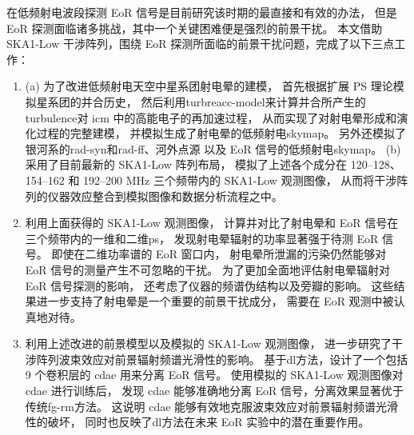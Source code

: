 
\begin{summary}

在低频射电波段探测 EoR 信号是目前研究该时期的最直接和有效的办法，
但是 EoR 探测面临诸多挑战，其中一个关键困难便是强烈的前景干扰。
本文借助 SKA1-Low 干涉阵列，围绕 EoR 探测所面临的前景干扰问题，完成了以下三点工作：
\begin{enumerate}
\item
(a) 为了改进低频射电天空中星系团射电晕的建模，
首先根据扩展 \ac{PS} 理论模拟星系团的并合历史，
然后利用\ac{turbreacc-model}来计算并合所产生的\ac{turbulence}对 \ac{icm}
中的高能电子的再加速过程，
从而实现了对射电晕形成和演化过程的完整建模，
并模拟生成了射电晕的低频射电\ac{skymap}。
另外还模拟了银河系的\ac{rad-syn}和\ac{rad-ff}、河外点源
以及 EoR 信号的低频射电\ac{skymap}。
(b) 采用了目前最新的 SKA1-Low 阵列布局，
模拟了上述各个成分在 \numrange{120}{128}、\numrange{154}{162}
和 \numrange{192}{200} \si{\MHz} 三个频带内的 SKA1-Low 观测图像，
从而将干涉阵列的仪器效应整合到模拟图像和数据分析流程之中。

\item
利用上面获得的 SKA1-Low 观测图像，
计算并对比了射电晕和 EoR 信号在三个频带内的一维和二维\ac{ps}，
发现射电晕辐射的功率显著强于待测 EoR 信号。
即使在二维功率谱的 EoR 窗口内，
射电晕所泄漏的污染仍然能够对 EoR 信号的测量产生不可忽略的干扰。
为了更加全面地评估射电晕辐射对 EoR 信号探测的影响，
还考虑了仪器的频谱伪结构以及旁瓣的影响。
这些结果进一步支持了射电晕是一个重要的前景干扰成分，
需要在 EoR 观测中被认真地对待。

\item
利用上述改进的前景模型以及模拟的 SKA1-Low 观测图像，
进一步研究了干涉阵列波束效应对前景辐射频谱光滑性的影响。
基于\ac{dl}方法，设计了一个包括 9 个卷积层的 \ac{cdae} 用来分离 EoR 信号。
使用模拟的 SKA1-Low 观测图像对 \ac{cdae} 进行训练后，
发现 \ac{cdae} 能够准确地分离 EoR 信号，分离效果显著优于传统\ac{fg-rm}方法。
这说明 \ac{cdae} 能够有效地克服波束效应对前景辐射频谱光滑性的破坏，
同时也反映了\ac{dl}方法在未来 EoR 实验中的潜在重要作用。
\end{enumerate}



\end{summary}

